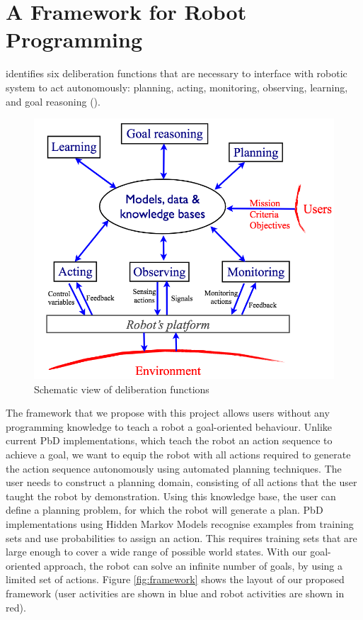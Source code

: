 \chapter{A Framework for Robot Programming}

\cite{ingrand2017deliberation} identifies six deliberation functions that are necessary to interface with robotic system to act autonomously: planning, acting, monitoring, observing, learning, and goal reasoning ().

\begin{figure}[h]
	\centering
	\includegraphics[scale=0.50]{figures/deliberationfunctions}
	\caption{Schematic view of deliberation functions \cite{ingrand2017deliberation}}
	\label{fig:deliberationfunctions}
\end{figure}

The framework that we propose with this project allows users without any programming knowledge to teach a robot a goal-oriented behaviour. 
Unlike current PbD implementations, which teach the robot an action sequence to achieve a goal, we want to equip the robot with all actions required to generate the action sequence autonomously using automated planning techniques. The user needs to construct a planning domain, consisting of all actions that the user taught the robot by demonstration.
 Using this knowledge base, the user can define a planning problem, for which the robot will generate a plan.
 PbD implementations using Hidden Markov Models recognise examples from training sets and use probabilities to assign an action.
 This requires training sets that are large enough to cover a wide range of possible world states.
 With our goal-oriented approach, the robot can solve an infinite number of goals, by using a limited set of actions.
 Figure \ref{fig:framework} shows the layout of our proposed framework (user activities are shown in blue and robot activities are shown in red).
 

